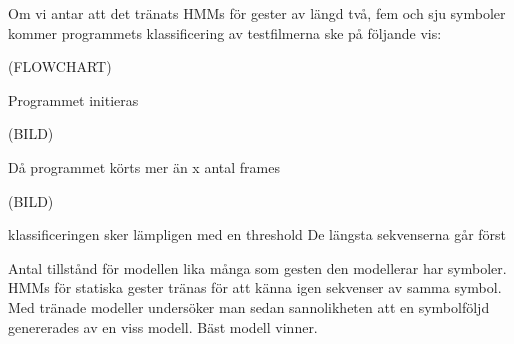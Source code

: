 \documentclass[../rapport_MVEX01-11-05]{subfiles}
\begin{document}

Om vi antar att det tränats HMMs för gester av längd två, fem och sju symboler kommer programmets 
klassificering av testfilmerna ske på följande vis:
 
 
 
 
(FLOWCHART)

Programmet initieras

(BILD)

Då programmet körts mer än x antal frames

(BILD)

klassificeringen sker lämpligen med en threshold 
De längsta sekvenserna går först


Antal tillstånd för modellen lika många som gesten den modellerar har symboler.
HMMs för statiska gester tränas för att känna igen sekvenser av samma symbol.
Med tränade modeller undersöker man sedan sannolikheten att en symbolföljd genererades av en viss modell.
Bäst modell vinner.

 
\end{document}
